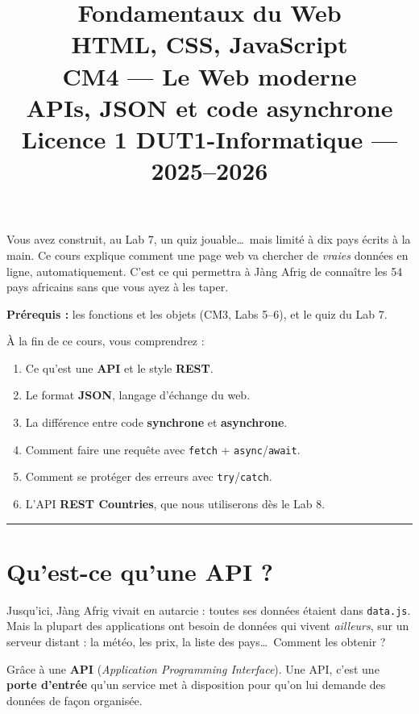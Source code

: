 \documentclass[11pt,a4paper]{article}
\title{%
\vspace{-1cm}
\textbf{\LARGE Fondamentaux du Web}\\
\textbf{\LARGE HTML, CSS, JavaScript}\\[0.8cm]
\textbf{\huge CM4 --- Le Web moderne}\\[0.3cm]
\textbf{\Large APIs, JSON et code asynchrone}\\[0.5cm]
\large Licence 1 DUT1-Informatique --- 2025--2026}
\date{}
\author{}
\newcommand{\code}[1]{\texttt{#1}}
\begin{document}
\maketitle
\thispagestyle{empty}

\begin{prereqbox}
Vous avez construit, au Lab 7, un quiz jouable\ldots\ mais limité à dix pays écrits à la main. Ce cours explique comment une page web va chercher de \emph{vraies} données en ligne, automatiquement. C'est ce qui permettra à Jàng Afrig de connaître les 54 pays africains sans que vous ayez à les taper.

\smallskip
\textbf{Prérequis :} les fonctions et les objets (CM3, Labs 5--6), et le quiz du Lab 7.
\end{prereqbox}

\begin{objectifbox}[Objectifs du CM4]
À la fin de ce cours, vous comprendrez :
\begin{enumerate}[leftmargin=*,noitemsep]
  \item Ce qu'est une \textbf{API} et le style \textbf{REST}.
  \item Le format \textbf{JSON}, langage d'échange du web.
  \item La différence entre code \textbf{synchrone} et \textbf{asynchrone}.
  \item Comment faire une requête avec \code{fetch} + \code{async}/\code{await}.
  \item Comment se protéger des erreurs avec \code{try}/\code{catch}.
  \item L'API \textbf{REST Countries}, que nous utiliserons dès le Lab 8.
\end{enumerate}
\end{objectifbox}

\tableofcontents
\bigskip\hrule\bigskip

\section{Qu'est-ce qu'une API ?}

Jusqu'ici, Jàng Afrig vivait en autarcie : toutes ses données étaient dans \code{data.js}. Mais la plupart des applications ont besoin de données qui vivent \emph{ailleurs}, sur un serveur distant : la météo, les prix, la liste des pays\ldots\ Comment les obtenir ?

Grâce à une \textbf{API} (\emph{Application Programming Interface}). Une API, c'est une \textbf{porte d'entrée} qu'un service met à disposition pour qu'on lui demande des données de façon organisée.
\end{document}
